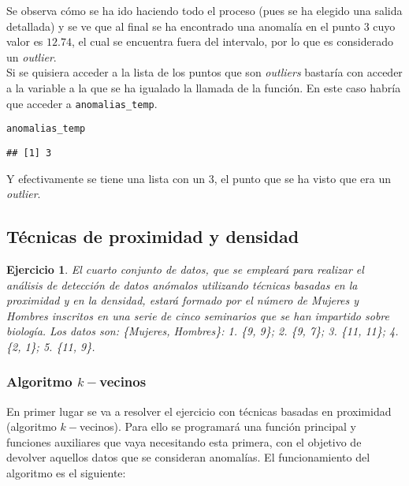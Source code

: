 \documentclass[12pt]{report}\usepackage[]{graphicx}\usepackage[dvipsnames]{xcolor}
\makeatletter
\newcommand{\hlstd}[1]{\textcolor[rgb]{0.345,0.345,0.345}{#1}}%
\newenvironment{kframe}{%
 \def\at@end@of@kframe{}%
 \ifinner\ifhmode%
  \def\at@end@of@kframe{\end{minipage}}%
  \begin{minipage}{\columnwidth}%
 \fi\fi%
 \def\FrameCommand##1{\hskip\@totalleftmargin \hskip-\fboxsep
 \colorbox{shadecolor}{##1}\hskip-\fboxsep
     \hskip-\linewidth \hskip-\@totalleftmargin \hskip\columnwidth}%
 \MakeFramed {\advance\hsize-\width
   \@totalleftmargin\z@ \linewidth\hsize
   \@setminipage}}%
 {\par\unskip\endMakeFramed%
 \at@end@of@kframe}
\newenvironment{knitrout}{}{} %
\newtheorem{exercise}{Ejercicio}[section]
\makeatother
\begin{document}
					Se observa cómo se ha ido haciendo todo el proceso (pues se ha elegido una salida detallada) y se ve que al final se ha encontrado una anomalía en el punto 3 cuyo valor es $12.74$, el cual se encuentra fuera del intervalo, por lo que es considerado un \textit{outlier}.\\
					
					Si se quisiera acceder a la lista de los puntos que son \textit{outliers} bastaría con acceder a la variable a la que se ha igualado la llamada de la función. En este caso habría que acceder a \texttt{anomalias\_temp}.
					
\begin{knitrout}
\color{fgcolor}\begin{kframe}
\begin{alltt}
\hlstd{anomalias_temp}
\end{alltt}
\begin{verbatim}
## [1] 3
\end{verbatim}
\end{kframe}
\end{knitrout}
					
					Y efectivamente se tiene una lista con un 3, el punto que se ha visto que era un \textit{outlier}. 
					
			\subsection{Técnicas de proximidad y densidad}
			
				\begin{exercise}
					El cuarto conjunto de datos, que se empleará para realizar el análisis de detección de datos anómalos utilizando técnicas basadas en la proximidad y en la densidad, estará formado por el número de Mujeres y Hombres inscritos en una serie de cinco seminarios que se han impartido sobre biología. Los datos son: \{Mujeres, Hombres\}: 1. \{9, 9\}; 2. \{9, 7\}; 3. \{11, 11\}; 4. \{2, 1\}; 5. \{11, 9\}.
				\end{exercise}
					
				\subsubsection{Algoritmo $k-$vecinos}
					
					En primer lugar se va a resolver el ejercicio con técnicas basadas en proximidad (algoritmo $k-$vecinos). Para ello se programará una función principal y funciones auxiliares que vaya necesitando esta primera, con el objetivo de devolver aquellos datos que se consideran anomalías. El funcionamiento del algoritmo es el siguiente: \\
					
\end{document}
